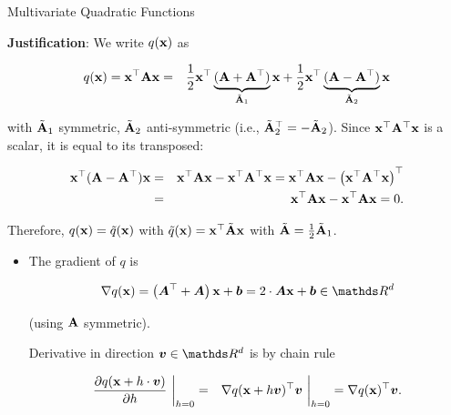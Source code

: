 \documentclass[11pt,compress,t,notes=noshow, xcolor=table]{beamer}
\begin{document}
\begin{vbframe}{Multivariate Quadratic Functions}
  
  \textbf{Justification}: We write $q(\mathbf{x})$ as
  
  \vspace*{-0.3cm}
  
  \begin{eqnarray*}
    q(\mathbf{x}) = \mathbf{x}^\top \mathbf{A} \mathbf{x} &=& \frac{1}{2} \mathbf{x}^\top \underbrace{(\mathbf{A} + \mathbf{A}^\top)}_{\tilde {\mathbf{A}}_1} \mathbf{x} + \frac{1}{2} \mathbf{x}^\top \underbrace{(\mathbf{A} - \mathbf{A}^\top)}_{\tilde {\mathbf{A}}_2} \mathbf{x}
  \end{eqnarray*}
  
  with $\tilde {\mathbf{A}}_1$ symmetric, $\tilde {\mathbf{A}}_2$ anti-symmetric (i.e., $\tilde {\mathbf{A}}_2^\top = - \tilde {\mathbf{A}}_2$). Since $\mathbf{x}^\top \mathbf{A}^\top \mathbf{x}$ is a scalar, it is equal to its transposed: 
  
  \vspace*{-0.3cm}
  
  \begin{eqnarray*}
     \mathbf{x}^\top (\mathbf{A} - \mathbf{A}^\top) \mathbf{x} &=&  \mathbf{x}^\top \mathbf{A} \mathbf{x} - \mathbf{x}^\top \mathbf{A}^\top \mathbf{x} =  \mathbf{x}^\top \mathbf{A} \mathbf{x} - \left(\mathbf{x}^\top \mathbf{A}^\top \mathbf{x}\right)^\top \\
     &=& \mathbf{x}^\top \mathbf{A} \mathbf{x} - \mathbf{x}^\top \mathbf{A} \mathbf{x}  = 0.
  \end{eqnarray*}
  
  Therefore, $q(\mathbf{x}) = \tilde q(\mathbf{x})$ with $\tilde q(\mathbf{x}) = \mathbf{x}^\top \tilde {\mathbf{A}} \mathbf{x}$ with $\tilde {\mathbf{A}} = \frac{1}{2} \tilde {\mathbf{A}}_1$. 
  
  \framebreak 
  
  \begin{itemize}
    \item The gradient of $q$ is 
  
    \begin{eqnarray*}
      \nabla q(\xv) = \left(\bm{A}^\top + \bm{A}\right) \xv + \bm{b} = 2 \cdot \bm{A} \xv + \bm{b} \in \R^d
    \end{eqnarray*}
  
    (using $\mathbf{A}$ symmetric). 
  
    \vspace*{0.2cm}
  
    Derivative in direction $\bm{v}\in \R^d$ is by chain rule
  
    \begin{eqnarray*}
      \frac{\partial q(\mathbf{x} + h \cdot \bm{v})}{\partial h}~\bigg\rvert_{h = 0} &=& \nabla q(\mathbf{x} + h \bm{v})^\top \bm{v}~\bigg\rvert_{h = 0} = \nabla q(\mathbf{x})^\top \bm{v}.
    \end{eqnarray*}
  

\end{itemize}
\end{vbframe}
\end{document}
